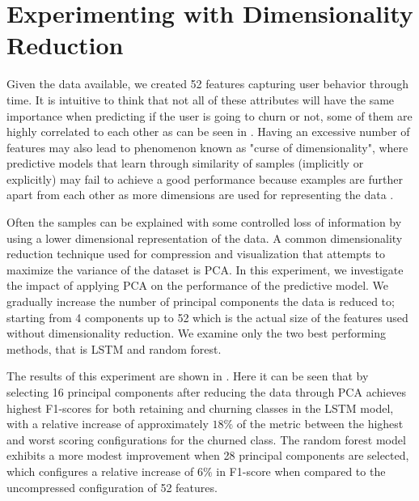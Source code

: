 \documentclass{kththesis}
\begin{document}
\section{Experimenting with Dimensionality Reduction}

Given the data available, we created 52 features capturing user behavior through time. It is intuitive to think that not all of these attributes will have the same importance when predicting if the user is going to churn or not, some of them are highly correlated to each other as can be seen in . Having an excessive number of features may also lead to phenomenon known as "curse of dimensionality", where predictive models that learn through similarity of samples (implicitly or explicitly) may fail to achieve a good performance because examples are further apart from each other as more dimensions are used for representing the data \citep{domingos2012few}. 

Often the samples can be explained with some controlled loss of information by using a lower dimensional representation of the data. A common dimensionality reduction technique used for compression and visualization that attempts to maximize the variance of the dataset is PCA. In this experiment, we investigate the impact of applying PCA on the performance of the predictive model. We gradually increase the number of principal components the data is reduced to; starting from 4 components up to 52 which is the actual size of the features used without dimensionality reduction. We examine only the two best performing methods, that is LSTM and random forest.

The results of this experiment are shown in . Here it can be seen that by selecting 16 principal components after reducing the data through PCA achieves highest F1-scores for both retaining and churning classes in the LSTM model, with a relative increase of approximately $18\%$ of the metric between the highest and worst scoring configurations for the churned class. The random forest model exhibits a more modest improvement when 28 principal components are selected, which configures a relative increase of $6\%$ in F1-score when compared to the uncompressed configuration of 52 features.
\end{document}
